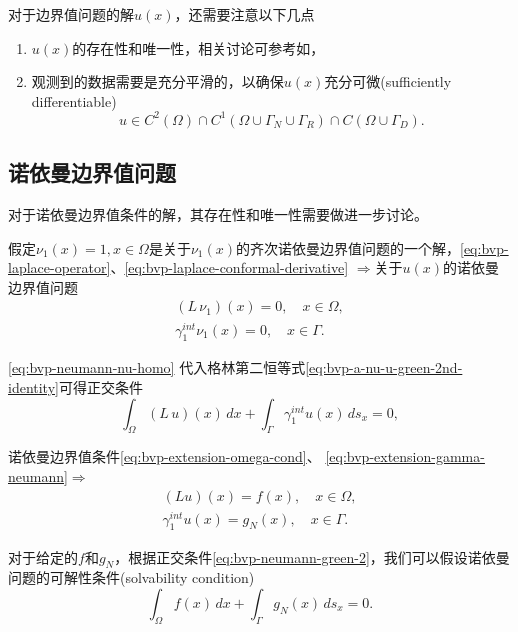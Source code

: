 对于边界值问题的解$u(x)$，还需要注意以下几点
\begin{enumerate}
  \item $u(x)$的存在性和唯一性，相关讨论可参考如\cite{Ladyzhenskaya:1968vq}，
  \item 观测到的数据需要是充分平滑的，以确保$u(x)$充分可微(sufficiently differentiable)
  \begin{equation*}
    u \in C^2(\Omega) \cap C^1 \left( \Omega \cup \Gamma_N \cup \Gamma_R \right) \cap C(\Omega \cup \Gamma_D).
  \end{equation*}
\end{enumerate}

\subsection{诺依曼边界值问题}
对于诺依曼边界值条件的解，其存在性和唯一性需要做进一步讨论。

假定$\nu_1(x)=1, x \in \Omega$是关于$\nu_1(x)$的齐次诺依曼边界值问题的一个解，\eqref{eq:bvp-laplace-operator}、\eqref{eq:bvp-laplace-conformal-derivative} $\Rightarrow$关于$u(x)$的诺依曼边界值问题
\begin{equation}
  \label{eq:bvp-neumann-nu-homo}
  \begin{split}
    \left( L \, \nu_1 \right)(x)=0, \quad x \in \Omega,\\
    \gamma_1^{int} \nu_1(x) = 0, \quad x \in \Gamma.
  \end{split}
\end{equation}

\eqref{eq:bvp-neumann-nu-homo}
代入格林第二恒等式\eqref{eq:bvp-a-nu-u-green-2nd-identity}可得正交条件
\begin{equation}
  \label{eq:bvp-neumann-green-2}
  \int_{\Omega} \left( L \, u \right)(x) \, dx + \int_{\Gamma} \gamma_1^{int} u(x) \, d s_x = 0,
\end{equation}

诺依曼边界值条件\eqref{eq:bvp-extension-omega-cond}、 \eqref{eq:bvp-extension-gamma-neumann}$\Rightarrow$
\begin{equation}
  \label{eq:bvp-neumann-cond}
\begin{split}
  \left( L u \right)(x) = f(x), \quad x \in \Omega, \\
  \gamma_1^{int} u(x) = g_N(x), \quad x \in \Gamma.
\end{split}
\end{equation}

对于给定的$f$和$g_N$，根据正交条件\eqref{eq:bvp-neumann-green-2}，我们可以假设诺依曼问题的可解性条件(solvability condition)
\begin{equation}
  \label{eq:bvp-neumann-green-2-new}
  \int_{\Omega} f(x) \, dx + \int_{\Gamma} g_N(x) \, d s_x = 0.
\end{equation}


